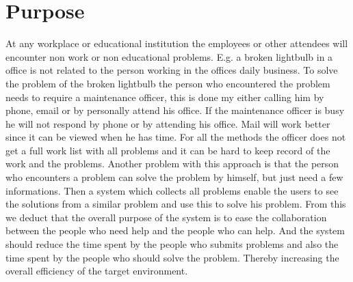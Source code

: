 \section{Purpose}
At any workplace or educational institution the employees or other attendees will encounter non work or non educational problems. 
E.g. a broken lightbulb in a office is not related to the person working in the offices daily business. 
To solve the problem of the broken lightbulb the person who encountered the problem needs to require a maintenance officer, this is done my either calling him by phone, email or by personally attend his office. 
If the maintenance officer is busy he will not respond by phone or by attending his office. Mail will work better since it can be viewed when he has time. 
For all the methods the officer does not get a full work list with all problems and it can be hard to keep record of the work and the problems. 
Another problem with this approach is that the person who encounters a problem can solve the problem by himself, but just need a few informations. Then a system which collects all problems enable the users to see the solutions from a similar problem and use this to solve his problem. 
From this we deduct that the overall purpose of the system is to ease the collaboration between the people who need help and the people who can help. 
And the system should reduce the time spent by the people who submits problems and also the time spent by the people who should solve the problem. 
Thereby increasing the overall efficiency of the target environment. 

